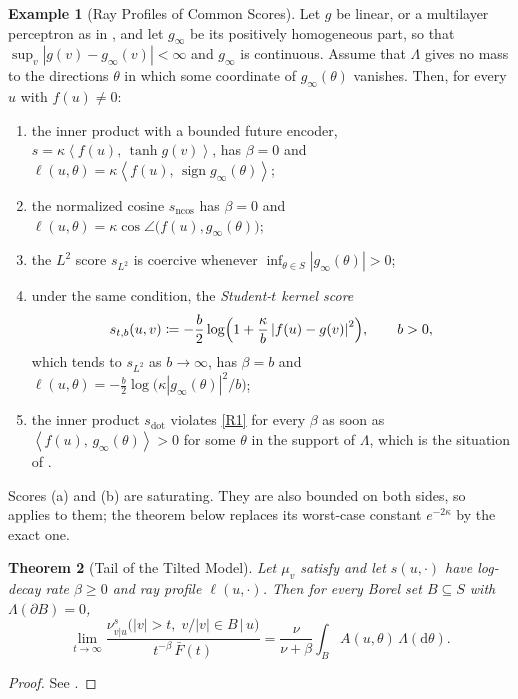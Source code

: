 \documentclass[11pt]{article}
\theoremstyle{plain}
\newtheorem{theorem}{Theorem}[section]
\theoremstyle{definition}
\newtheorem{example}[theorem]{Example}
\theoremstyle{remark}
\newcommand{\Dd}{\mathrm{d}}
\newcommand{\define}{\coloneqq}
\newcommand{\IP}[2]{\left\langle #1,\, #2 \right\rangle}
\newcommand{\abs}[1]{\left\lvert #1 \right\rvert}
\newcommand{\sdot}{s_{\mathrm{dot}}}
\newcommand{\sncos}{s_{\mathrm{ncos}}}
\newcommand{\sltwo}{s_{L^2}}
\begin{document}
\begin{example}[Ray Profiles of Common Scores]
 \label{ex:profiles}
 Let $g$ be linear, or a multilayer perceptron as in , and let
 $g_\infty$ be its positively homogeneous part, so that
 $\sup_v\abs{g(v)-g_\infty(v)}<\infty$ and $g_\infty$ is continuous. Assume
 that $\Lambda$ gives no mass to the directions $\theta$ in which some
 coordinate of $g_\infty(\theta)$ vanishes. Then, for every $u$ with $f(u)\ne0$:
 \begin{enumerate}[label=(\alph*)]
  \item the inner product with a bounded future encoder,
        $s=\kappa\IP{f(u)}{\tanh g(v)}$, has $\beta=0$ and
        $\ell(u,\theta)=\kappa\IP{f(u)}{\operatorname{sign}g_\infty(\theta)}$;
  \item the normalized cosine $\sncos$ has $\beta=0$ and
        $\ell(u,\theta)=\kappa\cos\angle\bigl(f(u),g_\infty(\theta)\bigr)$;
  \item the $L^2$ score $\sltwo$ is coercive whenever
        $\inf_{\theta\in S}\abs{g_\infty(\theta)}>0$;
  \item under the same condition, the \emph{Student-$t$ kernel score}
        \begin{equation}
         s_{t,b}(u,v)\define-\frac{b}{2}\log\Bigl(1+\frac{\kappa}{b}\abs{f(u)-g(v)}^{2}\Bigr),\qquad b>0,
         \label{eq:tkernel}
        \end{equation}
        which tends to $\sltwo$ as $b\to\infty$, has $\beta=b$ and
        $\ell(u,\theta)=-\tfrac{b}{2}\log\bigl(\kappa\abs{g_\infty(\theta)}^{2}/b\bigr)$;
  \item the inner product $\sdot$ violates \ref{R1} for every $\beta$ as soon
        as $\IP{f(u)}{g_\infty(\theta)}>0$ for some $\theta$ in the support of
        $\Lambda$, which is the situation of .
 \end{enumerate}
 Scores (a) and (b) are saturating. They are also bounded on both sides, so
  applies to them; the theorem below replaces its
 worst-case constant $e^{-2\kappa}$ by the exact one.
\end{example}

\begin{theorem}[Tail of the Tilted Model]
 \label{thm:tail}
 Let $\mu_v$ satisfy  and let $s(u,\cdot)$ have log-decay rate
 $\beta\ge0$ and ray profile $\ell(u,\cdot)$. Then for every Borel set
 $B\subseteq S$ with $\Lambda(\partial B)=0$,
 \begin{equation}
  \lim_{t\to\infty}
  \frac{\nu^{s}_{v\vert u}\bigl(\abs{v}>t,\;v/\abs{v}\in B\,\big\vert\,u\bigr)}{t^{-\beta}\,\bar F(t)}
  =\frac{\nu}{\nu+\beta}\int_{B}A(u,\theta)\,\Lambda(\Dd\theta).
  \label{eq:tail}
 \end{equation}
\end{theorem}
\begin{proof}
 See .
\end{proof}
\end{document}
